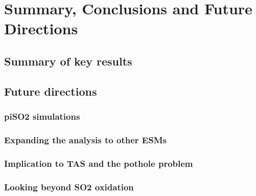 \chapter{Summary, Conclusions and Future Directions}
\ifpdf
    \graphicspath{{Chapter6/Figs/Raster/}{Chapter6/Figs/PDF/}{Chapter6/Figs/}}
\else
    \graphicspath{{Chapte6/Figs/Vector/}{Chapter6/Figs/}}
\fi


\section{Summary of key results}

\section{Future directions}

\subsection{piSO2 simulations}

\subsection{Expanding the analysis to other ESMs}

\subsection{Implication to TAS and the pothole problem}

\subsection{Looking beyond SO2 oxidation}



